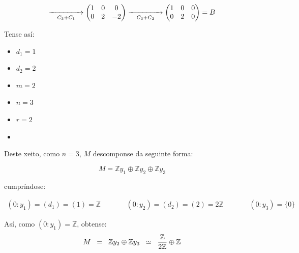 \documentclass[twoside]{report}
\theoremstyle{mystyle}
\begin{document}
\vspace{3mm}

$$
\underset{C_{3} + C_{1}}{\xrightarrow{\hspace{15mm}}}
\begin{pmatrix}
1 & 0 & 0 \\
0 & 2 & -2
\end{pmatrix}
\underset{C_{3} + C_{2}}{\xrightarrow{\hspace{15mm}}}
\begin{pmatrix}
1 & 0 & 0 \\
0 & 2 & 0
\end{pmatrix}
= B
$$

\vspace{3mm}

\noindent Tense así:

\begin{multicols}{3}
\begin{itemize}
    \item $d_{1} = 1$
    \item $d_{2} = 2$
    \item $m = 2$
    \item $n = 3$
    \item $r = 2$
    \item[\vspace{\fill}]
\end{itemize}
\end{multicols}

\vspace{3mm}

\noindent Deste xeito, como $n = 3$, $M$ descomponse da seguinte forma:

$$M = \mathbb{Z}y_{1} \oplus \mathbb{Z}y_{2} \oplus \mathbb{Z}y_{3}$$

\vspace{3mm}

\noindent cumpríndose:

\begin{align*}
    (0 : y_{1}) = (d_{1}) = (1) = \mathbb{Z} & \qquad &  (0:y_{2}) = (d_{2}) = (2) = 2\mathbb{Z} & \qquad & (0 : y_{3}) = \{0\}
\end{align*}

\pagebreak

\noindent Así, como $(0 : y_{1}) = \mathbb{Z}$, obtense: 
$$M \hspace{2mm} = \hspace{2mm} \mathbb{Z}y_{2} \oplus \mathbb{Z}y_{3} \hspace{2mm} \simeq \hspace{2mm} \displaystyle \frac{\mathbb{Z}}{2\mathbb{Z}} \oplus \mathbb{Z}$$
\end{document}
